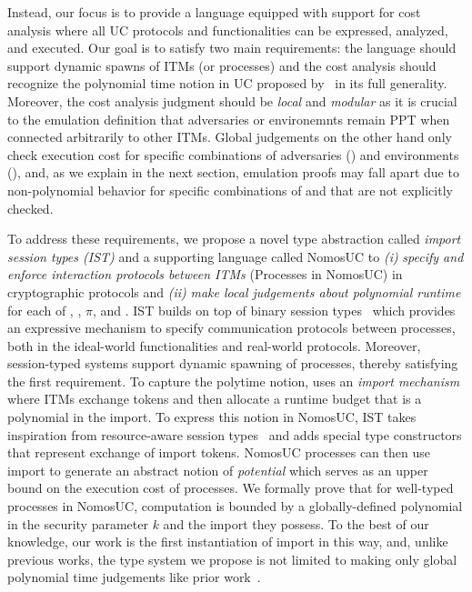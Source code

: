 Instead, our focus is to provide a language equipped with support for cost analysis where all UC protocols
and functionalities can be expressed, analyzed, and executed.
Our goal is to satisfy two main requirements: the language should support dynamic spawns of ITMs (or processes)
and the cost analysis should recognize the polynomial time notion in UC proposed by~\citet{canettiUC} in its
full generality.
Moreover, the cost analysis judgment should be \emph{local} and \emph{modular} as it is crucial to the emulation
definition that adversaries or environemnts remain PPT when connected arbitrarily to other ITMs.
Global judgements on the other hand only check execution cost for specific combinations of adversaries (\A) and environments (\Z),
and, as we explain in the next section, emulation proofs may fall apart due to non-polynomial behavior for specific
combinations of \Z and \A that are not explicitly checked.

To address these requirements, we propose a novel type abstraction called \emph{import session types (IST)} and
a supporting language called NomosUC to 
\emph{(i)} \emph{specify and enforce interaction protocols between ITMs} (Processes in NomosUC) in cryptographic protocols and 
\emph{(ii)} \emph{make local judgements about polynomial runtime} for each of \A, \F, $\pi$, and \Z.
IST builds on top of binary session types~\cite{HondaCONCUR1993,HondaESOP1998,HondaPOPL2008,caires2010session,ToninhoESOP2013}
which provides an expressive mechanism to specify communication protocols between processes, both in the ideal-world
functionalities and real-world protocols.
Moreover, session-typed systems support dynamic spawning of processes, thereby satisfying the first requirement.
To capture the polytime notion, \citet{canettiUC} uses an \emph{import mechanism} where ITMs exchange tokens and
then allocate a runtime budget that is a polynomial in the import.
To express this notion in NomosUC, IST takes inspiration from resource-aware session types~\cite{das2018work,dasnomos,Das20arxiv}
and adds special type constructors that represent exchange of import tokens.
NomosUC processes can then use import to generate an abstract notion of \emph{potential} which serves as an upper
bound on the execution cost of processes.
We formally prove that for well-typed processes in NomosUC, computation is bounded by a globally-defined polynomial
in the security parameter $k$ and the import they possess.
To the best of our knowledge, our work is the first instantiation of import in this way, and, unlike previous works,
the type system we propose is not limited to making only global polynomial time judgements like prior work~\cite{ilc, ipdl}.

